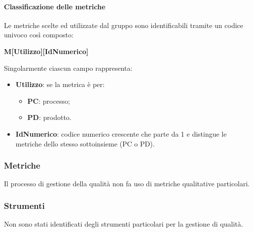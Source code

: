 \paragraph{Classificazione delle metriche}
Le metriche scelte ed utilizzate dal gruppo sono identificabili tramite un codice univoco così composto: 
\begin{center}
\textbf{M[Utilizzo][IdNumerico]}
\end{center}
Singolarmente ciascun campo rappresenta:
\begin{itemize}
	\item \textbf{Utilizzo}: se la metrica è per:
			\begin{itemize}
				\item \textbf{PC}: processo;
				\item \textbf{PD}: prodotto.
			\end{itemize}
	\item \textbf{IdNumerico}: codice numerico crescente che parte da 1 e distingue le metriche dello stesso sottoinsieme (PC o PD). 
\end{itemize}

\subsubsection{Metriche}
Il processo di gestione della qualità non fa uso di metriche qualitative particolari.

\subsubsection{Strumenti}
Non sono stati identificati degli strumenti particolari per la gestione di qualità.
